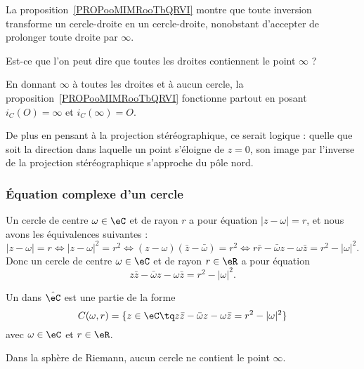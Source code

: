\begin{probleme}        \label{PROBooZHHTooIFNwxR}
	La proposition~\ref{PROPooMIMRooTbQRVI} montre que toute inversion transforme un cercle-droite en un cercle-droite, nonobstant d'accepter de prolonger toute droite par \( \infty\).

	Est-ce que l'on peut dire que toutes les droites contiennent le point \( \infty\) ?

	En donnant \( \infty\) à toutes les droites et à aucun cercle, la proposition~\ref{PROPooMIMRooTbQRVI} fonctionne partout en posant \( i_C(O)=\infty\) et \( i_C(\infty)=O\).

	De plus en pensant à la projection stéréographique, ce serait logique : quelle que soit la direction dans laquelle un point s'éloigne de \( z=0\), son image par l'inverse de la projection stéréographique s'approche du pôle nord.
\end{probleme}

\subsubsection{Équation complexe d'un cercle}

Un cercle de centre \( \omega\in \eC\) et de rayon \( r\) a pour équation \( | z-\omega |=r\), et nous avons les équivalences suivantes :
\begin{equation}
	| z-\omega |=r\Leftrightarrow | z-\omega |^2=r^2\Leftrightarrow (z-\omega)(\bar z-\bar \omega)=r^2\Leftrightarrow r\bar r-\bar \omega z-\omega \bar z=r^2-| \omega |^2.
\end{equation}
Donc un cercle de centre \( \omega\in \eC\) et de rayon \( r\in \eR\) a pour équation
\begin{equation}        \label{EQooDIFRooKRZZoi}
	z\bar z-\bar\omega z-\omega\bar z=r^2-| \omega |^2.
\end{equation}

\begin{definition}      \label{DEFooAUDJooVqLDhe}
	Un  dans \( \hat\eC\) est une partie de la forme
	\begin{equation}
		C(\omega,r)=\{ z\in \eC\tq z\bar z-\bar\omega z-\omega\bar z=r^2-| \omega |^2 \}
	\end{equation}
	avec \( \omega\in \eC\) et \( r\in \eR\).
\end{definition}
Dans la sphère de Riemann, aucun cercle ne contient le point \( \infty\).

